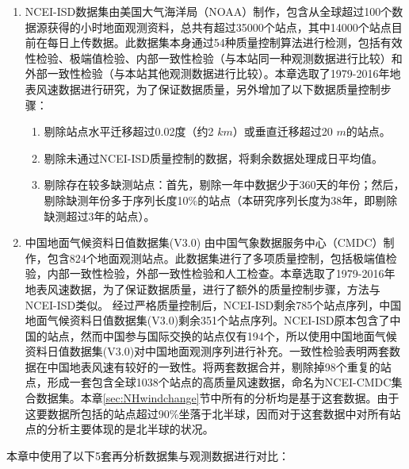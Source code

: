 \begin{enumerate}
\item NCEI-ISD数据集\citep{smith2011the}由美国大气海洋局（NOAA）制作，包含从全球超过100个数据源获得的小时地面观测资料，总共有超过35000个站点，其中14000个站点目前在每日上传数据。此数据集本身通过54种质量控制算法进行检测，包括有效性检验、极端值检验、内部一致性检验（与本站同一种观测数据进行比较）和外部一致性检验（与本站其他观测数据进行比较）。本章选取了1979-2016年地表风速数据进行研究，为了保证数据质量，另外增加了以下数据质量控制步骤：
\begin{enumerate}
\item 剔除站点水平迁移超过0.02度（约2 $km$）或垂直迁移超过20 $m$的站点。
\item 剔除未通过NCEI-ISD质量控制的数据，将剩余数据处理成日平均值。
\item 剔除存在较多缺测站点：首先，剔除一年中数据少于360天的年份；然后，剔除缺测年份多于序列长度10\%的站点（本研究序列长度为38年，即剔除缺测超过3年的站点）。
\end{enumerate}
\item 中国地面气候资料日值数据集(V3.0) 由中国气象数据服务中心（CMDC）制作，包含824个地面观测站点。此数据集进行了多项质量控制，包括极端值检验，内部一致性检验，外部一致性检验和人工检查。本章选取了1979-2016年地表风速数据，为了保证数据质量，进行了额外的质量控制步骤，方法与NCEI-ISD类似。
经过严格质量控制后，NCEI-ISD剩余785个站点序列，中国地面气候资料日值数据集(V3.0)剩余351个站点序列。NCEI-ISD原本包含了中国的站点，然而中国参与国际交换的站点仅有194个，所以使用中国地面气候资料日值数据集(V3.0)对中国地面观测序列进行补充。一致性检验表明两套数据在中国地表风速有较好的一致性。将两套数据合并，剔除掉98个重复的站点，形成一套包含全球1038个站点的高质量风速数据，命名为NCEI-CMDC集合数据集。本章\ref{sec:NHwindchange}节中所有的分析均是基于这套数据。由于这要数据所包括的站点超过90\%坐落于北半球，因而对于这套数据中对所有站点的分析主要体现的是北半球的状况。
\end{enumerate}

本章中使用了以下5套再分析数据集与观测数据进行对比：

